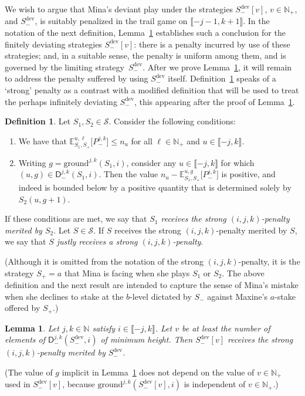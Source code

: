 \documentclass[letterpaper,11pt,oneside,reqno]{amsbook}
\newcommand{\N}{\ensuremath{\mathbb{N}}}
\newcommand{\E}[0]{\mathbb{E}}
\numberwithin{figure}{chapter}
\newtheorem{lemma}[theorem]{Lemma}
\theoremstyle{definition}
\theoremstyle{definition}
\theoremstyle{definition}
\newtheorem{definition}[theorem]{Definition}
\theoremstyle{definition}
\theoremstyle{definition}
\newcommand{\mc}{\mathcal}
\newcommand{\nwithzero}{\N}
\newcommand{\nwithoutzero}{\N_+}
\newcommand{\ground}{\textrm{ground}}
\newcommand{\sdev}{S_-^{\textrm{dev}}}
\begin{document}
We wish to argue that Mina's deviant play under the strategies $\sdev[v]$, $v \in \nwithoutzero$, and $\sdev$, is suitably penalized in the trail game on $\llbracket -j-1,k+1 \rrbracket$.
In the notation of the next definition, Lemma~\ref{l.baseconseq} establishes such a conclusion for the finitely deviating strategies $\sdev[v]$: there is a penalty incurred by use of these strategies; and, in a suitable sense, the penalty is uniform among them, and is governed by the limiting strategy~$\sdev$.
After we prove Lemma~\ref{l.baseconseq}, it will remain to address the penalty suffered by using $\sdev$ itself. Definition~\ref{d.merit} speaks of a `strong' penalty as a contrast with a modified definition that will be used to treat the perhaps infinitely deviating $\sdev$, this appearing after the proof of Lemma~\ref{l.baseconseq}.
\begin{definition}\label{d.merit}
Let $S_1,S_2 \in \mc{S}$. Consider the following conditions:
\begin{enumerate}
\item We have that $\E^{u,\ell}_{S_1,S_+} \big[ P^{j,k}_- \big] \leq n_u$ for all $\ell \in \nwithoutzero$ and $u \in \llbracket -j,k \rrbracket$. 
\item Writing $g = \ground^{j,k}(S_1,i)$, consider any $u \in \llbracket -j,k \rrbracket$ for which $(u,g) \in \mathsf{D}_-^{j,k}(S_1,i)$. Then  the value $n_u -  \E^{u,g}_{S_1,S_+} \big[ P^{j,k}_- \big]$ is positive, and indeed is bounded below by a positive quantity that is determined solely by $S_2(u,g+1)$.
\end{enumerate}
If these conditions are met, we say that {\em $S_1$ receives the strong $(i,j,k)$-penalty merited by $S_2$}.
Let $S \in \mc{S}$. If $S$ receives the strong $(i,j,k)$-penalty merited by $S$, we say that {\em $S$  justly receives a  strong $(i,j,k)$-penalty}. 
\end{definition}
(Although it is omitted from the notation of  the strong $(i,j,k)$-penalty, it is the strategy $S_+ = a$ that Mina is facing when she plays $S_1$ or $S_2$. The above definition and the next result are intended to capture the sense of Mina's mistake when she declines to stake at the $b$-level dictated by $S_-$ against Maxine's $a$-stake offered by $S_+$.)
 \begin{lemma}\label{l.baseconseq}
 Let $j,k \in \nwithzero$ satisfy $i \in \llbracket -j,k \rrbracket$.
Let $v$ be at least the number of elements of $\mathsf{D}_-^{j,k}(\sdev,i)$ of minimum height. 
Then $\sdev[v]$ receives the strong $(i,j,k)$-penalty merited by $\sdev$.
 \end{lemma}
 (The value of $g$ implicit in Lemma~\ref{l.baseconseq} does not depend on the value of $v \in \nwithoutzero$ used in $\sdev[v]$, because $\ground^{j,k}(\sdev[v],i)$  is independent of $v \in \nwithoutzero$.)
 
\end{document}

